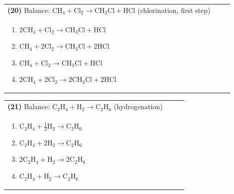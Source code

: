\documentclass{article}
\begin{document}
\vspace{0.2cm}
\noindent \begin{tabular}{|p{0.9\linewidth}|}
\hline
\vspace{0.2cm}
\textbf{(20)} Balance: \(\mathrm{CH_4 + Cl_2 \rightarrow CH_3Cl + HCl}\) (chlorination, first step)\\
\begin{minipage}[t]{0.85\linewidth}
\begin{enumerate}[label=\alph*.]
   \item \(\mathrm{2CH_4 + Cl_2 \rightarrow CH_3Cl + HCl}\)
   \item \(\mathrm{CH_4 + 2Cl_2 \rightarrow CH_3Cl + 2HCl}\)
   \item \(\mathrm{CH_4 + Cl_2 \rightarrow CH_3Cl + HCl}\)
   \item \(\mathrm{2CH_4 + 2Cl_2 \rightarrow 2CH_3Cl + 2HCl}\)
\end{enumerate}
\end{minipage}\\
\hline
\end{tabular}
\newpage

\vspace{0.2cm}
\noindent \begin{tabular}{|p{0.9\linewidth}|}
\hline
\vspace{0.2cm}
\textbf{(21)} Balance: \(\mathrm{C_2H_4 + H_2 \rightarrow C_2H_6}\) (hydrogenation)\\
\begin{minipage}[t]{0.85\linewidth}
\begin{enumerate}[label=\alph*.]
   \item \(\mathrm{C_2H_4 + \tfrac{1}{2}H_2 \rightarrow C_2H_6}\)
   \item \(\mathrm{C_2H_4 + 2H_2 \rightarrow C_2H_6}\)
   \item \(\mathrm{2C_2H_4 + H_2 \rightarrow 2C_2H_6}\)
   \item \(\mathrm{C_2H_4 + H_2 \rightarrow C_2H_6}\)
\end{enumerate}
\end{minipage}\\
\hline
\end{tabular}
\end{document}
